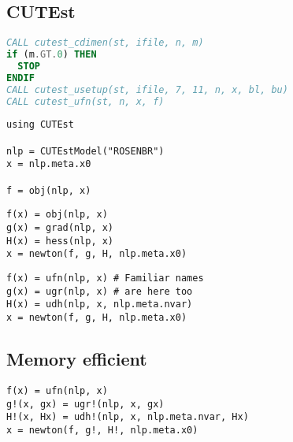 \subsection{CUTEst}

\begin{frame}[t,fragile]
\begin{lstlisting}[language=Fortran]
CALL cutest_cdimen(st, ifile, n, m)
if (m.GT.0) THEN
  STOP
ENDIF
CALL cutest_usetup(st, ifile, 7, 11, n, x, bl, bu)
CALL cutest_ufn(st, n, x, f)
\end{lstlisting}
\end{frame}

\begin{frame}[t,fragile]
\begin{lstlisting}
using CUTEst

nlp = CUTEstModel("ROSENBR")
x = nlp.meta.x0

f = obj(nlp, x)
\end{lstlisting}
\end{frame}

\begin{frame}[t,fragile]

\begin{lstlisting}
f(x) = obj(nlp, x)
g(x) = grad(nlp, x)
H(x) = hess(nlp, x)
x = newton(f, g, H, nlp.meta.x0)
\end{lstlisting}
\end{frame}

\begin{frame}[t,fragile]

\begin{lstlisting}
f(x) = ufn(nlp, x) # Familiar names
g(x) = ugr(nlp, x) # are here too
H(x) = udh(nlp, x, nlp.meta.nvar)
x = newton(f, g, H, nlp.meta.x0)
\end{lstlisting}
\end{frame}

\subsection{Memory efficient}

\begin{frame}[t,fragile]

\end{frame}

\begin{frame}[t,fragile]
\begin{lstlisting}
f(x) = ufn(nlp, x)
g!(x, gx) = ugr!(nlp, x, gx)
H!(x, Hx) = udh!(nlp, x, nlp.meta.nvar, Hx)
x = newton(f, g!, H!, nlp.meta.x0)
\end{lstlisting}
\end{frame}

